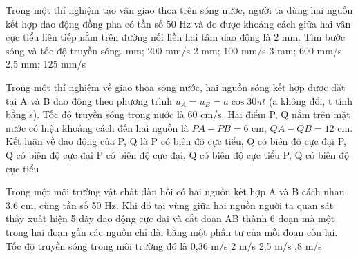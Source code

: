\begin{vidu}%
Trong một thí nghiệm tạo vân giao thoa trên sóng nước, người ta dùng hai nguồn kết hợp dao động đồng pha có tần số 50 Hz và đo được khoảng cách giữa hai vân cực tiểu liên tiếp nằm trên đường nối liền hai tâm dao động là 2 mm. Tìm bước sóng và tốc độ truyền sóng.
\choice
{ mm; 200 mm/s}
{2 mm; 100 mm/s}
{3 mm; 600 mm/s}
{2,5 mm; 125 mm/s}
\end{vidu} %
\begin{vidu}%
Trong một thí nghiệm về giao thoa sóng nước, hai nguồn sóng kết hợp được đặt tại A và B dao động theo phương trình $u_A = u_B = a\cos30\pi t$ (a không đổi, t tính bằng s). Tốc độ truyền sóng trong nước là 60 cm/s. Hai điểm P, Q nằm trên mặt nước có hiệu khoảng cách đến hai nguồn là $PA-PB=6$ cm, $QA-QB=12$ cm. Kết luận về dao động của P, Q là
\choice
{\True P có biên độ cực tiểu, Q có biên độ cực đại}
{P, Q có biên độ cực đại}
{P có biên độ cực đại, Q có biên độ cực tiểu}
{P, Q có biên độ cực tiểu}
\end{vidu} %
\begin{vidu}%
Trong một môi trường vật chất đàn hồi có hai nguồn kết hợp A và B cách nhau 3,6 cm, cùng tần số 50 Hz. Khi đó tại vùng giữa hai nguồn người ta quan sát thấy xuất hiện 5 dãy dao động cực đại và cắt đoạn AB thành 6 đoạn mà một trong hai đoạn gần các nguồn chỉ dài bằng một phần tư của mỗi đoạn còn lại. Tốc độ truyền sóng trong môi trường đó là
\choice
{0,36 m/s}
{2 m/s}
{2,5 m/s}
{,8 m/s}
\end{vidu} %
